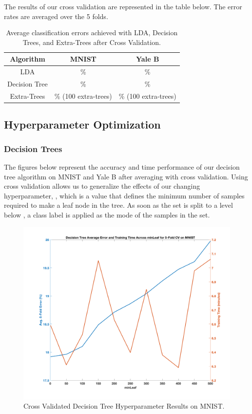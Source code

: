 The results of our cross validation are represented in the table below. The error rates are averaged over the 5 folds.
\begin{table}[H]
  \centering
  \begin{tabular}{||c | c | c||} 
    \hline
    Algorithm & MNIST & Yale B \\
    \hline\hline
    LDA & \%  & \% \\ 
    \hline
    Decision Tree & \% & \% \\ 
    \hline
    Extra-Trees & \% (100 extra-trees) & \% (100 extra-trees) \\
    \hline
  \end{tabular}
  \caption{Average classification errors achieved with LDA, Decision Trees, and Extra-Trees after Cross Validation.}
\end{table}

\subsection{Hyperparameter Optimization}

\subsubsection{Decision Trees}

The figures below represent the accuracy and time performance of our decision tree algorithm on MNIST and Yale B after averaging with cross validation. Using cross validation allows us to generalize the effects of our changing hyperparameter, , which is a value that defines the minimum number of samples required to make a leaf node in the tree. As soon as the set is split to a level below , a class label is applied as the mode of the samples in the set.
%
\begin{figure}[H]
  \centering\includegraphics[width=0.6\columnwidth]{../images/cv_dt_mnist}
  \caption{Cross Validated Decision Tree Hyperparameter Results on MNIST.}
\end{figure}

